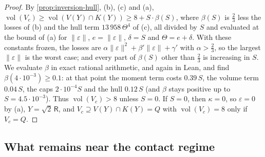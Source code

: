 \documentclass[11pt,reqno]{amsart}
\renewcommand{\_}{\origunderscore\allowbreak}
\numberwithin{equation}{section}
\theoremstyle{plain}
\theoremstyle{definition}
\theoremstyle{remark}
\newcommand{\Rt}{\mathsf{R}}                 %
\DeclareMathOperator{\vol}{vol}
\begin{document}
\begin{proof}
By \cref{prop:inversion-hull}, (b), (c) and (a),
$\vol(V_c)\ge\vol(V(Y)\cap K(Y))\ge8+S\cdot\beta(S)$, where $\beta(S)$ is
$\frac23$ less the losses of (b) and the hull term $13\,958\,\Theta^4$ of (c),
all divided by $S$ and evaluated at the bound of (a) for $\|\varepsilon\|$, $e=\|\varepsilon\|$,
$\delta=S$ and $\Theta=e+\delta$. With these constants frozen, the losses are
$\alpha\|\varepsilon\|^2+\beta'\|\varepsilon\|+\gamma'$ with $\alpha>\frac23$, so the
largest $\|\varepsilon\|$ is the worst case; and every part of $\beta(S)$ other
than $\frac23$ is increasing in $S$. We evaluate
$\beta$ in exact rational arithmetic, and again in Lean, and find $\beta(4\cdot10^{-3})\ge0.1$:
at that point the moment term costs $0.39\,S$, the volume term $0.04\,S$,
the caps $2\cdot10^{-4}S$ and the hull $0.12\,S$ (and $\beta$ stays positive up to
$S=4.5\cdot10^{-3}$). Thus $\vol(V_c)>8$ unless $S=0$. If $S=0$, then $\kappa=0$, so $\varepsilon=0$ by
(a), $Y=\sqrt2\,\Rt$, and $V_c\supseteq V(Y)\cap K(Y)=Q$ with
$\vol(V_c)=8$ only if $V_c=Q$.
\end{proof}



\subsection{What remains near the contact regime}\label{sec:remains}
\end{document}
